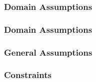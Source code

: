 \documentclass[12pt]{article}
\begin{document}
	\subsubsection{Domain Assumptions}
	
	
	\subsubsection{Domain Assumptions}
	
	\subsubsection{General Assumptions}
	
	\subsubsection{Constraints}
	
	\clearpage
\end{document}
